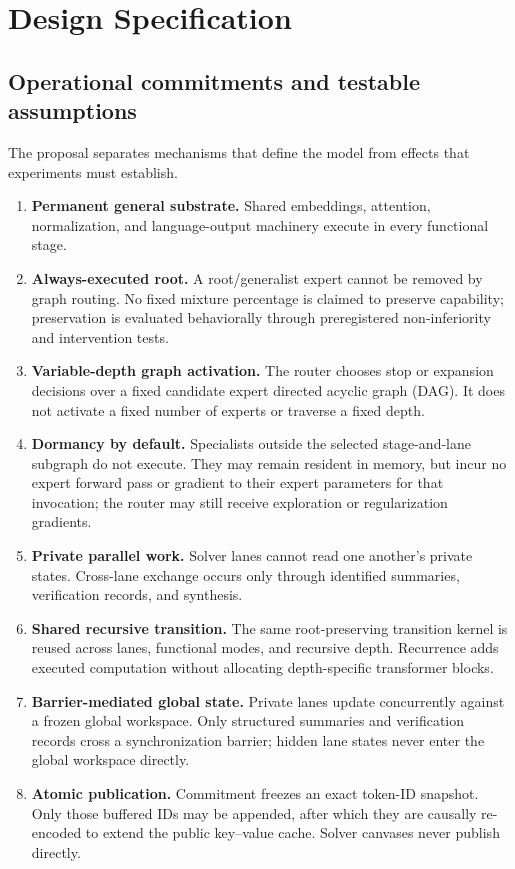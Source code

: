 \documentclass[10pt,a4paper]{article}
\begin{document}
\section{Design Specification}
\label{sec:design}

\subsection{Operational commitments and testable assumptions}

The proposal separates mechanisms that define the model from effects that
experiments must establish.

\begin{enumerate}[label=\textbf{I\arabic*.},leftmargin=2.8em]
\item \textbf{Permanent general substrate.} Shared embeddings, attention,
  normalization, and language-output machinery execute in every functional
  stage.
\item \textbf{Always-executed root.} A root/generalist expert cannot be removed
  by graph routing. No fixed mixture percentage is claimed to preserve
  capability; preservation is evaluated behaviorally through preregistered
  non-inferiority and intervention tests.
\item \textbf{Variable-depth graph activation.} The router chooses stop or
  expansion decisions over a fixed candidate expert directed acyclic graph
  (DAG). It does not activate a fixed number of experts or traverse a fixed
  depth.
\item \textbf{Dormancy by default.} Specialists outside the selected
  stage-and-lane subgraph do not execute. They may remain resident in memory,
  but incur no expert forward pass or gradient to their expert parameters for
  that invocation; the router may still receive exploration or regularization
  gradients.
\item \textbf{Private parallel work.} Solver lanes cannot read one another's
  private states. Cross-lane exchange occurs only through identified summaries,
  verification records, and synthesis.
\item \textbf{Shared recursive transition.} The same root-preserving transition
  kernel is reused across lanes, functional modes, and recursive depth.
  Recurrence adds executed computation without allocating depth-specific
  transformer blocks.
\item \textbf{Barrier-mediated global state.} Private lanes update concurrently
  against a frozen global workspace. Only structured summaries and verification
  records cross a synchronization barrier; hidden lane states never enter the
  global workspace directly.
\item \textbf{Atomic publication.} Commitment freezes an exact token-ID
  snapshot. Only those buffered IDs may be appended, after which they are
  causally re-encoded to extend the public key--value cache. Solver canvases
  never publish directly.
\end{enumerate}
\end{document}
